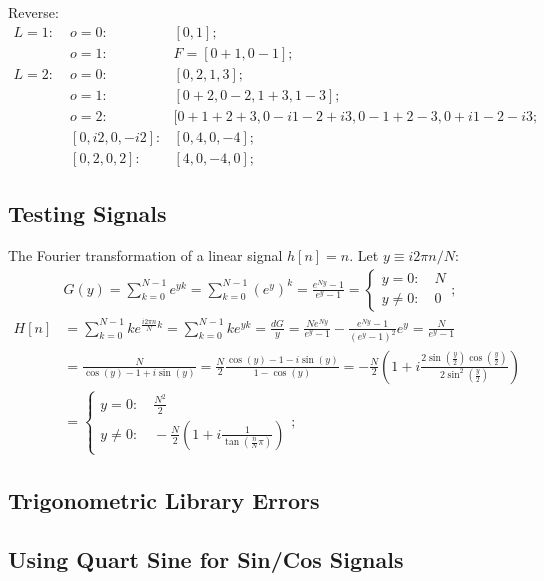 \documentclass[twoside]{article}
\numberwithin{equation}{section}
\begin{document}
Reverse:
\begin{align*}
L = 1:\;& o=0: & [0, 1]; \\
 & o = 1: & F = [0 + 1, 0 - 1]; \\
L = 2:\;& o=0: & [0, 2, 1, 3]; \\
 & o = 1: & [0 + 2, 0 - 2, 1 + 3, 1 - 3]; \\
 & o = 2: & [0 + 1 + 2 + 3, 0 - i 1 - 2 + i 3 , 0 - 1 + 2 - 3, 0 + i 1 - 2 - i 3; \\
 & [0, i 2, 0, - i 2]:& [0, 4, 0, -4]; \\
 & [0, 2, 0, 2]:& [4, 0, -4, 0];
\end{align*}


\subsection{Testing Signals}

The Fourier transformation of a linear signal $h[n] = n$. 
Let $y \equiv i 2\pi n /N$:
\begin{align*}
& G(y) = \sum_{k=0}^{N-1}  e^{y k} = \sum_{k=0}^{N-1}  (e^y)^k = \frac{e^{N y} - 1}{e^y - 1}
 = \begin{cases} y = 0: \quad N \\ y \neq 0: \quad 0 \end{cases}; \\
H[n] &= \sum_{k=0}^{N-1} k e^{\frac{i 2\pi n}{N} k} = \sum_{k=0}^{N-1} k e^{y k} 
 = \frac{d G}{y} = \frac{N e^{N y}}{e^y - 1} - \frac{e^{N y} - 1}{(e^y - 1)^2} e^y = \frac{N}{e^y - 1} \\
 &= \frac{N}{\cos(y) - 1 + i \sin(y)} = \frac{N}{2} \frac{\cos(y) - 1 -  i \sin(y)}{1 - \cos(y)} 
  = - \frac{N}{2}(1 + i \frac{2 \sin(\frac{y}{2}) \cos(\frac{y}{2})}{2 \sin^2(\frac{y}{2})}) \\
 &= \begin{cases} y = 0: \quad \frac{N^2}{2} \\ y \neq 0: \quad - \frac{N}{2}(1 + i \frac{1}{\tan(\frac{n}{N} \pi)}) \end{cases};
\end{align*}


\subsection{Trigonometric Library Errors}

\subsection{Using Quart Sine for Sin/Cos Signals}
\end{document}
